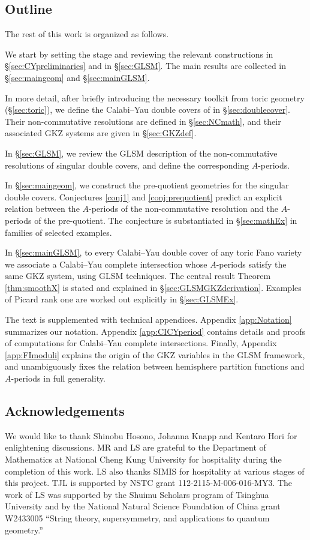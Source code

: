 \documentclass[12pt,a4paper,oneside]{amsart}
\numberwithin{equation}{section}
\theoremstyle{definition}
\theoremstyle{remark}
\DeclareRobustCommand{\SkipTocEntry}[5]{}
\begin{document}
 




\subsection{Outline}
The rest of this work is organized as follows.\par
We start by setting the stage and reviewing the relevant constructions in 
\S\ref{sec:CYpreliminaries} and in \S\ref{sec:GLSM}. The main results are collected in \S\ref{sec:maingeom} and \S\ref{sec:mainGLSM}.\par
In more detail, after briefly introducing the necessary toolkit from toric geometry (\S\ref{sec:toric}), we define the Calabi--Yau double covers of \cite{Hosono:2020gpj} in \S\ref{sec:doublecover}. Their non-commutative resolutions are defined in \S\ref{sec:NCmath}, and their associated GKZ systems are given in \S\ref{sec:GKZdef}. 

In \S\ref{sec:GLSM}, we review the GLSM description of the non-commutative resolutions of singular double covers, and define the corresponding $A$-periods.\par
In \S\ref{sec:maingeom}, we construct the pre-quotient geometries for the singular double covers. Conjectures \ref{conj1} and \ref{conj:prequotient} predict an explicit relation between the $A$-periods of the non-commutative resolution and the $A$-periods of the pre-quotient. The conjecture is substantiated in \S\ref{sec:mathEx} in families of selected examples. 

In \S\ref{sec:mainGLSM}, to every Calabi--Yau double cover of any toric Fano variety we associate a Calabi--Yau complete intersection whose $A$-periods satisfy the same GKZ system, using GLSM techniques. The central result Theorem \ref{thm:smoothX} is stated and explained in \S\ref{sec:GLSMGKZderivation}. Examples of Picard rank one are worked out explicitly in \S\ref{sec:GLSMEx}.\par
The text is supplemented with technical appendices. Appendix \ref{app:Notation} summarizes our notation. Appendix \ref{app:CICYperiod} contains details and proofs of computations for Calabi--Yau complete intersections. Finally, Appendix \ref{app:FImoduli} explains the origin of the GKZ variables in the GLSM framework, and unambiguously fixes the relation between hemisphere partition functions and $A$-periods in full generality. 



\subsection*{Acknowledgements}
We would like to thank Shinobu Hosono, Johanna Knapp and Kentaro Hori for enlightening discussions. MR and LS are grateful to the Department of Mathematics at National Cheng Kung University for hospitality during the completion of this work. LS also thanks SIMIS for hospitality at various stages of this project. TJL is supported by
NSTC grant 112-2115-M-006-016-MY3.
The work of LS was supported by the Shuimu Scholars program of Tsinghua University and by the National Natural Science Foundation of China grant W2433005 ``String theory, supersymmetry, and applications to quantum geometry.''
\end{document}

